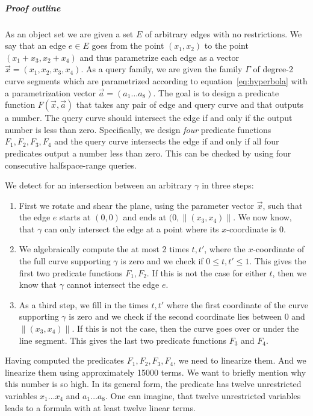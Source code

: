 \documentclass[UKenglish]{lipics-v2019}
\begin{document}
\subparagraph*{Proof outline}
As an object set we are given a set $E$ of arbitrary edges with no restrictions. We say that an edge $e \in E$ goes from the point $(x_1, x_2)$ to the point $(x_1 + x_3, x_2 + x_4)$ and thus parametrize each edge as a vector $\vec{x} = (x_1, x_2, x_3, x_4)$. As a query family, we are given the family $\Gamma$ of degree-2 curve segments which are parametrized according to equation~\ref{eq:hyperbola} with a parametrization vector $\vec{a} = (a_1 \ldots a_8)$. The goal is to design a predicate function $F(\vec{x}, \vec{a})$ that takes any pair of edge and query curve and that outputs a number. The query curve should intersect the edge if and only if the output number is less than zero. Specifically, we design \emph{four} predicate functions $F_1, F_2, F_3, F_4$ and the query curve intersects the edge if and only if all four predicates output a number less than zero. This can be checked by using four consecutive halfspace-range queries.

We detect for an intersection between an arbitrary $\gamma$ in three steps:
\begin{enumerate}
    \item First we rotate and shear the plane, using the parameter vector $\vec{x}$, such that the edge $e$ starts at $(0,0)$ and ends at $(0, \lVert (x_3, x_4) \rVert$. We now know, that $\gamma$ can only intersect the edge at a point where its $x$-coordinate is $0$. 
    \item We algebraically compute the at most 2 times $t, t'$, where the $x$-coordinate of the full curve supporting $\gamma$ is zero and we check if $0 \le t, t' \le 1$. This gives the first two predicate functions $F_1, F_2$. If this is not the case for either $t$, then we know that $\gamma$ cannot intersect the edge $e$.
    \item As a third step, we fill in the times $t, t'$ where the first coordinate of the curve supporting $\gamma$ is zero and we check if the second coordinate lies between $0$ and $ \lVert (x_3, x_4) \rVert$. If this is not the case, then the curve goes over or under the line segment. This gives the last two predicate functions $F_3$ and $F_4$.
\end{enumerate}

Having computed the predicates $F_1, F_2, F_3, F_4$, we need to linearize them. And we linearize them using approximately 15000 terms. We want to briefly mention why this number is so high. In its general form, the predicate has twelve unrestricted variables $x_1 \ldots x_4$ and $a_1 \ldots a_8$. One can imagine, that twelve unrestricted variables leads to a formula with at least twelve linear terms.
\end{document}

